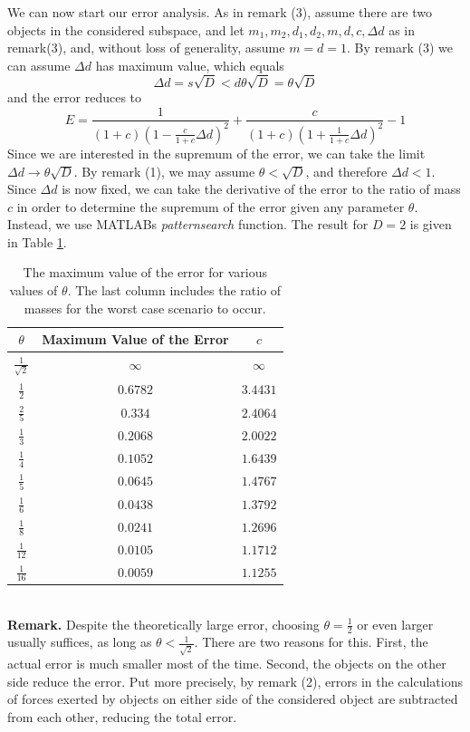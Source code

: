 We can now start our error analysis. As in remark (3), assume there are two objects in the considered subspace, and let $m_1,m_2,d_1,d_2,m,d,c,\Delta d$ as in remark(3), and, without loss of generality, assume $m = d = 1$. By remark (3) we can assume $\Delta d$ has maximum value, which equals
\[
\Delta d = s\sqrt{D} < d\theta \sqrt{D} = \theta\sqrt{D}
\]
and the error reduces to
\[
E = \frac{1}{(1+c)(1-\frac{c}{1+c}\Delta d)^2}+\frac{c}{(1+c)(1+\frac{1}{1+c}\Delta d)^2}-1
\]
Since we are interested in the supremum of the error, we can take the limit $\Delta d \rightarrow \theta \sqrt{D}$. By remark (1), we may assume $\theta < \sqrt{D}$, and therefore $\Delta d<1$.\\
Since $\Delta d$ is now fixed, we can take the derivative of the error to the ratio of mass $c$ in order to determine the supremum of the error given any parameter $\theta$. Instead, we use MATLABs \textit{patternsearch} function. The result for $D=2$ is given in Table \ref{tab:maxerror}.
\begin{table}[h!]
\centering
\caption{The maximum value of the error for various values of $\theta$. The last column includes the ratio of masses for the worst case scenario to occur.}
\label{tab:maxerror}
\begin{tabular}{c|c|c}
$\theta$ & Maximum Value of the Error & $c$\\
\hline
$\frac{1}{\sqrt{2}}$ & $\infty$ & $\infty$\\
$\frac{1}{2}$ & $0.6782$ & $3.4431$\\
$\frac{2}{5}$ & $0.334$ & $2.4064$\\
$\frac{1}{3}$ & $0.2068$ & $2.0022$\\
$\frac{1}{4}$ & $0.1052$ & $1.6439$\\
$\frac{1}{5}$ & $0.0645$ & $1.4767$\\
$\frac{1}{6}$ & $0.0438$ & $1.3792$\\
$\frac{1}{8}$ & $0.0241$ & $1.2696$\\
$\frac{1}{12}$ & $0.0105$ & $1.1712$\\
$\frac{1}{16}$ & $0.0059$ & $1.1255$ 
\end{tabular}
\end{table}\\
\textbf{Remark.} Despite the theoretically large error, choosing $\theta = \frac{1}{2}$ or even larger usually suffices, as long as $\theta < \frac{1}{\sqrt{2}}$. There are two reasons for this. First, the actual error is much smaller most of the time. Second, the objects on the other side reduce the error. Put more precisely, by remark (2), errors in the calculations of forces exerted by objects on either side of the considered object are subtracted from each other, reducing the total error.
